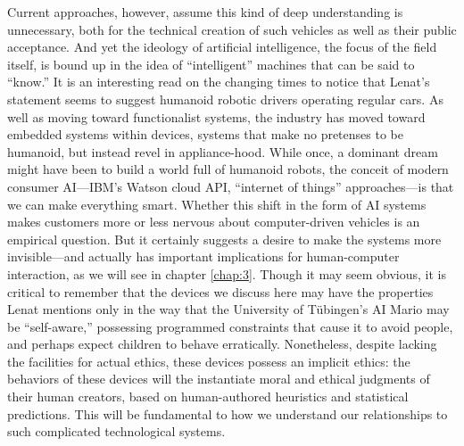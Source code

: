
Current approaches, however, assume this kind of deep understanding is
unnecessary, both for the technical creation of such vehicles as well
as their public acceptance. And yet the ideology of artificial
intelligence, the focus of the field itself, is bound up in the idea
of ``intelligent'' machines that can be said to ``know.'' It is an
interesting read on the changing 
times to notice that Lenat's statement seems to suggest humanoid
robotic drivers operating regular cars. As well as moving toward
functionalist systems, the industry has moved toward embedded systems
within devices, systems that make no pretenses to be humanoid, but
instead revel in appliance-hood. While once, a dominant dream might have been
to build a world full of humanoid robots, the conceit of modern
consumer AI---IBM's Watson cloud API, ``internet of things''
approaches---is that we can make everything smart. Whether this shift in the form of AI
systems makes customers more or less nervous about computer-driven
vehicles is an empirical question. But it certainly suggests a desire
to make the systems more 
invisible---and actually has important implications for human-computer
interaction, as we will see in chapter \ref{chap:3}. Though it may seem
obvious, it is critical to remember that the devices we discuss here may
have the properties Lenat mentions only in the way that the University
of T\"{u}bingen's AI Mario may be
``self-aware,'' possessing programmed constraints that cause it to
avoid people, and perhaps expect children to behave erratically.
Nonetheless, despite lacking the facilities for actual ethics, these
devices possess an implicit ethics: the
behaviors of these devices will the instantiate moral and
ethical judgments of their human creators, based on
human-authored heuristics and statistical predictions. This will be
fundamental to how we understand our relationships to such
complicated technological systems.

